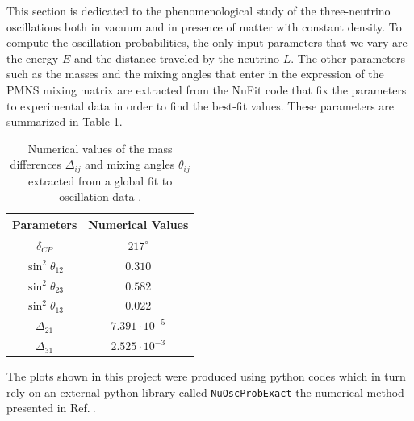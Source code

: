 \documentclass[twocolumn,secnumarabic,amssymb, nobibnotes, aps, prd,10pt]{revtex4-1}
\newcommand{\myref}[1]{Ref.$\:$\cite{#1}}
\begin{document}
This section is dedicated to the phenomenological study of the three-neutrino oscillations
both in vacuum and in presence of matter with constant density. To compute the oscillation
probabilities, the only input parameters that we vary are the energy $E$ and the distance
traveled by the neutrino $L$. The other parameters such as the masses and the mixing angles
that enter in the expression of the PMNS mixing matrix are extracted from the NuFit code 
that fix the parameters to experimental data in order to find the best-fit values. These
parameters are summarized in Table \ref{tab:params}.
\begin{table}[!ht]
\centering
\begin{tabular}[t]{|c|c|}
\hline
\textbf{Parameters} 		& \textbf{Numerical Values} \\
\hline
$\delta_{CP}$			& $217^{\circ}$  \\
\hline
$\sin^2 \theta_{12}$		& $0.310$ \\
\hline
$\sin^2 \theta_{23}$		& $0.582$ \\
\hline
$\sin^2 \theta_{13}$		& $0.022$ \\
\hline
$\Delta_{21}$			& $7.391 \cdot 10^{-5}$ \\
\hline
$\Delta_{31}$			& $2.525 \cdot 10^{-3}$ \\
\hline
\end{tabular}
\caption{Numerical values of the mass differences $\Delta_{ij}$ and mixing angles
$\theta_{ij}$ extracted from a global fit to oscillation data \cite{Esteban:2018azc}.}
\label{tab:params}
\end{table}

The plots shown in this project were produced using python codes \cite{} which in turn rely
on an external python library called \texttt{NuOscProbExact} the numerical method 
presented in \myref{Bustamante:2019ggq}.
\end{document}
